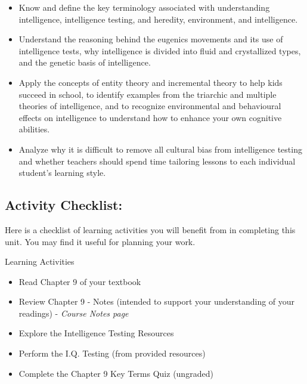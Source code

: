 \documentclass[
]{book}
\providecommand{\tightlist}{%
  \setlength{\itemsep}{0pt}\setlength{\parskip}{0pt}}
\begin{document}
\begin{itemize}
\tightlist
\item
  Know and define the key terminology associated with understanding intelligence, intelligence testing, and heredity, environment, and intelligence.\\
\item
  Understand the reasoning behind the eugenics movements and its use of intelligence tests, why intelligence is divided into fluid and crystallized types, and the genetic basis of intelligence.\\
\item
  Apply the concepts of entity theory and incremental theory to help kids succeed in school, to identify examples from the triarchic and multiple theories of intelligence, and to recognize environmental and behavioural effects on intelligence to understand how to enhance your own cognitive abilities.\\
\item
  Analyze why it is difficult to remove all cultural bias from intelligence testing and whether teachers should spend time tailoring lessons to each individual student's learning style.
\end{itemize}

\hypertarget{activity-checklist-1}{%
\subsection*{Activity Checklist:}\label{activity-checklist-1}}

Here is a checklist of learning activities you will benefit from in completing this unit. You may find it useful for planning your work.

\begin{reflect}
{Learning Activities}

\begin{itemize}
\tightlist
\item
  Read Chapter 9 of your textbook
\item
  Review Chapter 9 - Notes (intended to support your understanding of your readings) - \emph{Course Notes page}
\item
  Explore the Intelligence Testing Resources
\item
  Perform the I.Q. Testing (from provided resources)
\item
  Complete the Chapter 9 Key Terms Quiz (ungraded)
\end{itemize}
\end{reflect}
\end{document}
